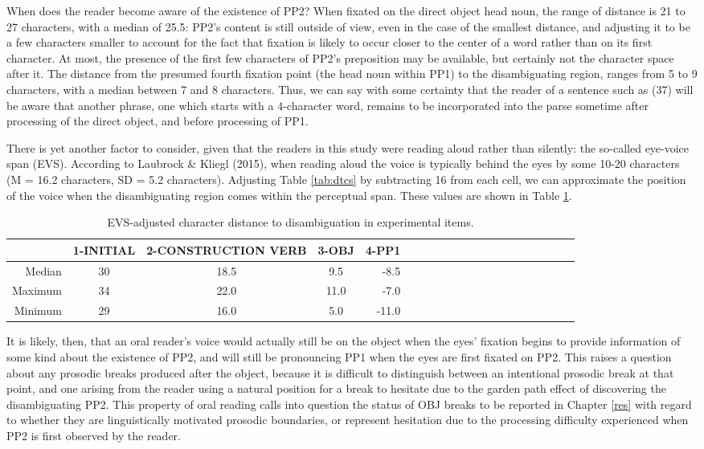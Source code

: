 \documentclass[11pt,oneside]{book}
\begin{document}
When does the reader become aware of the existence of PP2? When fixated on the direct object head noun, the range of distance is 21 to 27 characters, with a median of 25.5: PP2's content is still outside of view, even in the case of the smallest distance, and adjusting it to be a few characters smaller to account for the fact that fixation is likely to occur closer to the center of a word rather than on its first character. At most, the presence of the first few characters of PP2's preposition may be available, but certainly not the character space after it. The distance from the presumed fourth fixation point (the head noun within PP1) to the disambiguating region, ranges from 5 to 9 characters, with a median between 7 and 8 characters. Thus, we can say with some certainty that the reader of a sentence such as (37) will be aware that another phrase, one which starts with a 4-character word, remains to be incorporated into the parse sometime after processing of the direct object, and before processing of PP1.

There is yet another factor to consider, given that the readers in this study were reading aloud rather than silently: the so-called eye-voice span (EVS). According to Laubrock \& Kliegl (2015), when reading aloud the voice is typically behind the eyes by some 10-20 characters (M = 16.2 characters, SD = 5.2 characters). Adjusting Table \ref{tab:dtcs} by subtracting 16 from each cell, we can approximate the position of the voice when the disambiguating region comes within the perceptual span. These values are shown in Table \ref{tab:evsdtcr}.

\begin{table}[!h]

\caption{\label{tab:evsdtcr}EVS-adjusted character distance to disambiguation in experimental items.}
\centering
\begin{tabular}{rcccrcccrcccrcccrccc}
\toprule
  & 1-INITIAL & 2-CONSTRUCTION VERB & 3-OBJ & 4-PP1\\
\midrule
Median & 30 & 18.5 & 9.5 & -8.5\\
Maximum & 34 & 22.0 & 11.0 & -7.0\\
Minimum & 29 & 16.0 & 5.0 & -11.0\\
\bottomrule
\end{tabular}
\end{table}

It is likely, then, that an oral reader's voice would actually still be on the object when the eyes' fixation begins to provide information of some kind about the existence of PP2, and will still be pronouncing PP1 when the eyes are first fixated on PP2. This raises a question about any prosodic breaks produced after the object, because it is difficult to distinguish between an intentional prosodic break at that point, and one arising from the reader using a natural position for a break to hesitate due to the garden path effect of discovering the disambiguating PP2. This property of oral reading calls into question the status of OBJ breaks to be reported in Chapter \ref{res} with regard to whether they are linguistically motivated prosodic boundaries, or represent hesitation due to the processing difficulty experienced when PP2 is first observed by the reader.
\end{document}
